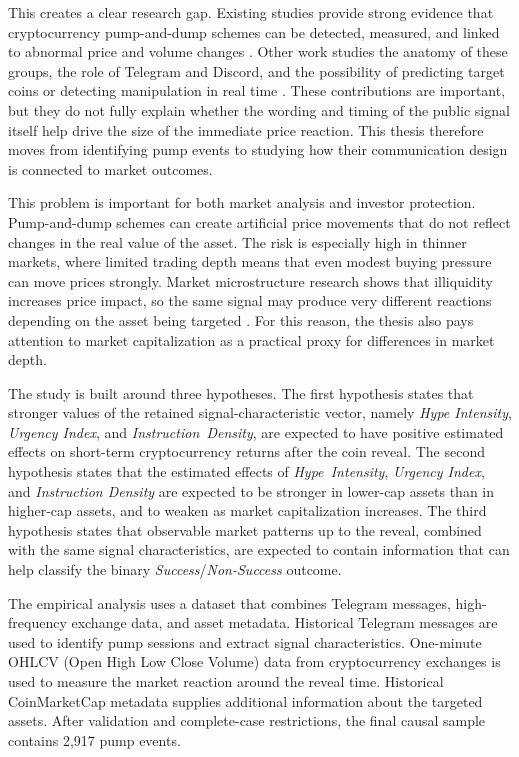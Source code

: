 This creates a clear research gap. Existing studies provide strong evidence that cryptocurrency pump-and-dump schemes can be detected, measured, and linked to abnormal price and volume changes \cite{kamps2018pump, victor2019cryptocurrency, li2021cryptocurrency}. Other work studies the anatomy of these groups, the role of Telegram and Discord, and the possibility of predicting target coins or detecting manipulation in real time \cite{xu2019anatomy, lamorgia2020pump, hu2023sequence}. These contributions are important, but they do not fully explain whether the wording and timing of the public signal itself help drive the size of the immediate price reaction. This thesis therefore moves from identifying pump events to studying how their communication design is connected to market outcomes.

This problem is important for both market analysis and investor protection. Pump-and-dump schemes can create artificial price movements that do not reflect changes in the real value of the asset. The risk is especially high in thinner markets, where limited trading depth means that even modest buying pressure can move prices strongly. Market microstructure research shows that illiquidity increases price impact, so the same signal may produce very different reactions depending on the asset being targeted \cite{amihud2002illiquidity, kyle1985continuous}. For this reason, the thesis also pays attention to market capitalization as a practical proxy for differences in market depth.

The study is built around three hypotheses. The first hypothesis states that stronger values of the retained signal-characteristic vector, namely \textit{Hype Intensity}, \textit{Urgency Index}, and \textit{Instruction~Density}, are expected to have positive estimated effects on short-term cryptocurrency returns after the coin reveal. The second hypothesis states that the estimated effects of \textit{Hype~Intensity}, \textit{Urgency Index}, and \textit{Instruction Density} are expected to be stronger in lower-cap assets than in higher-cap assets, and to weaken as market capitalization increases. The third hypothesis states that observable market patterns up to the reveal, combined with the same signal characteristics, are expected to contain information that can help classify the binary \textit{Success}/\textit{Non-Success} outcome.

The empirical analysis uses a dataset that combines Telegram messages, high-frequency exchange data, and asset metadata. Historical Telegram messages are used to identify pump sessions and extract signal characteristics. One-minute OHLCV (Open High Low Close Volume) data from cryptocurrency exchanges is used to measure the market reaction around the reveal time. Historical CoinMarketCap metadata supplies additional information about the targeted assets. After validation and complete-case restrictions, the final causal sample contains 2,917 pump events.

